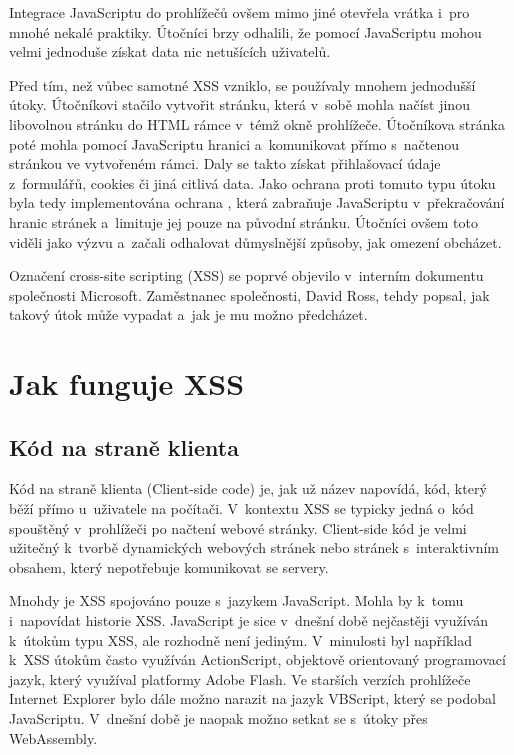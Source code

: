 \documentclass[11pt, conference, a4paper]{IEEEtran}
\begin{document}
Integrace JavaScriptu do prohlížečů ovšem mimo jiné otevřela vrátka i~pro mnohé nekalé praktiky. Útočníci brzy odhalili, že pomocí JavaScriptu mohou velmi jednoduše získat data nic netušících uživatelů. 

Před tím, než vůbec samotné XSS vzniklo, se používaly mnohem jednodušší útoky. Útočníkovi stačilo vytvořit stránku, která v~sobě mohla načíst jinou libovolnou stránku do HTML rámce v~témž okně prohlížeče. Útočníkova stránka poté mohla pomocí JavaScriptu  hranici a~komunikovat přímo s~načtenou stránkou ve vytvořeném rámci. Daly se takto získat přihlašovací údaje z~formulářů, cookies či jiná citlivá data. Jako ochrana proti tomuto typu útoku byla tedy implementována ochrana , která zabraňuje JavaScriptu v~překračování hranic stránek a~limituje jej pouze na původní stránku. Útočníci ovšem toto viděli jako výzvu a~začali odhalovat důmyslnější způsoby, jak omezení obcházet.

Označení cross-site scripting (XSS) se poprvé objevilo  v~interním dokumentu  společnosti Microsoft. Zaměstnanec společnosti, David Ross, tehdy popsal, jak takový útok může vypadat a~jak je mu možno předcházet.~\cite{Grossman2007}


\section{Jak funguje XSS}
\subsection{Kód na straně klienta}
Kód na straně klienta (Client-side code) je, jak už název napovídá, kód, který běží přímo u~uživatele na počítači. V~kontextu XSS se typicky jedná o~kód spouštěný v~prohlížeči po načtení webové stránky. Client-side kód je velmi užitečný k~tvorbě dynamických webových stránek nebo stránek s~interaktivním obsahem, který nepotřebuje komunikovat se servery.~\cite{XSS-cloudflare}

Mnohdy je XSS spojováno pouze s~jazykem JavaScript. Mohla by k~tomu i~napovídat historie XSS. JavaScript je sice v~dnešní době nejčastěji využíván k~útokům typu XSS, ale rozhodně není jediným. V~minulosti byl například k~XSS útokům často využíván ActionScript, objektově orientovaný programovací jazyk, který využíval platformy Adobe Flash. Ve starších verzích prohlížeče Internet Explorer bylo dále možno narazit na jazyk VBScript, který se podobal JavaScriptu. V~dnešní době je naopak možno setkat se s~útoky přes WebAssembly.
\end{document}
